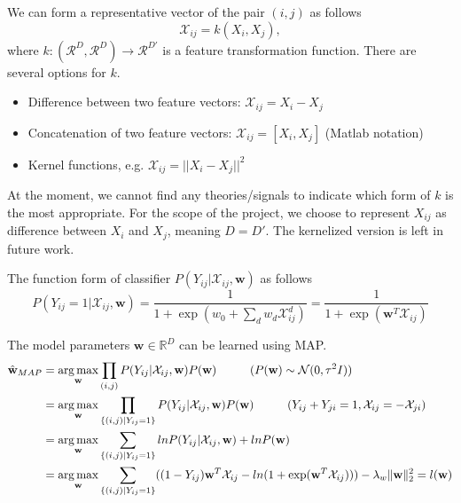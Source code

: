 	We can form a representative vector of the pair $(i, j)$ as follows
		\begin{equation}
			\mathcal{X}_{ij} = k (X_i, X_j),
		\end{equation}
	where $k: (\mathcal{R}^D, \mathcal{R}^D) \rightarrow \mathcal{R}^{D'}$ is a feature transformation function. There are several options for $k$. 
	\begin{itemize}
		\item Difference between two feature vectors: $\mathcal{X}_{ij} = X_i - X_j$
		\item Concatenation of two feature vectors:  $\mathcal{X}_{ij} = [X_i, X_j]$ (Matlab notation)
		\item Kernel functions, e.g. $\mathcal{X}_{ij} = || X_i - X_j ||^2$
	\end{itemize}
	At the moment, we cannot find any theories/signals to indicate which form of $k$ is the most appropriate. For the scope of the project, we choose to represent $X_{ij}$ as difference between $X_i$ and $X_j$, meaning $D = D'$. The kernelized version is left in future work. 

	The function form of classifier $P(Y_{ij}|\mathcal{X}_{ij}, \textbf{w})$ as follows
		 \begin{equation}
		 P(Y_{ij}=1|\mathcal{X}_{ij}, \textbf{w}) = \frac{1}{1 + \exp ( w_0 + \sum_d w_d \mathcal{X}_{ij}^d )} = \frac{1}{1 + \exp (\textbf{w}^T \mathcal{X}_{ij})}
		 \end{equation}
	 
	The model parameters $\textbf{w} \in \mathbb{R}^D$ can be learned using MAP.
		\begin{align}
		\label{eqn:objFuncLR}
		\hat{\textbf{w}}_{MAP} &= \operatorname*{arg\,max}_{\textbf{w}} \prod_{(i,j)} P(Y_{ij}| \mathcal{X}_{ij}, \textbf{w}) P(\textbf{w}) \hspace{1 cm} \text{($P(\textbf{w}) \sim \mathcal{N} (0, \tau^2 I) $)}\\ \notag
		&= \operatorname*{arg\,max}_{\textbf{w}} \prod_{\{(i,j)|Y_{ij}=1\}} P(Y_{ij}| \mathcal{X}_{ij}, \textbf{w}) P(\textbf{w}) \hspace{1 cm} \text{($Y_{ij} + Y_{ji} = 1, \mathcal{X}_{ij} = - \mathcal{X}_{ji}$)}\\ \notag
		&= \operatorname*{arg\,max}_{\textbf{w}} \sum_{\{(i,j)|Y_{ij}=1\}} ln P(Y_{ij}| \mathcal{X}_{ij}, \textbf{w}) + ln P(\textbf{w}) \\ \notag
		&= \operatorname*{arg\,max}_{\textbf{w}} \sum_{\{(i,j)|Y_{ij}=1\}} ( (1 - Y_{ij})\textbf{w}^T\mathcal{X}_{ij} - ln(1 + \exp(\textbf{w}^T\mathcal{X}_{ij}))) - \lambda_w \|\textbf{w} \|^2_2 = l(\textbf{w})
		\end{align}

